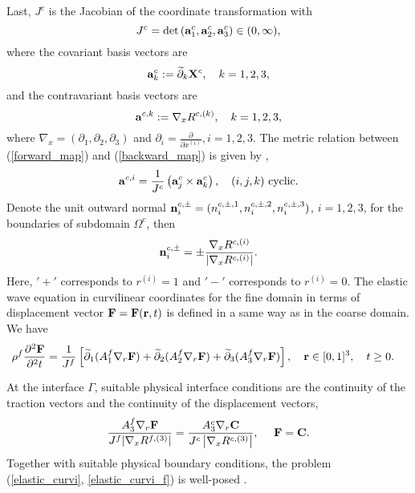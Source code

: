 Last, $J^c$ is the Jacobian of the coordinate transformation with
\[J^c = \mbox{det} \left({\bf a}^c_1,{\bf a}^c_2,{\bf a}^c_3\right)\in (0,\infty),\] 
where the covariant basis vectors are
\begin{equation}\label{forward_map}
{\bf a}_k^c := \wt{\partial}_k{\bf X}^c, \ \ \ k = 1,2,3,
\end{equation}
and the contravariant basis vectors are
\begin{equation}\label{backward_map}
{\bf a}^{c,k} := \nabla_x R^{c,(k)},\ \ \ k = 1,2,3,
\end{equation}
 where $\nabla_x = (\partial_1, \partial_2, \partial_3)$ and $\partial_i = \frac{\partial}{\partial x^{(i)}}, i = 1,2,3$. The metric relation between (\ref{forward_map}) and (\ref{backward_map}) is given by \cite{thompson1985numerical},
\begin{equation*}
{\bf a}^{c,i} = \frac{1}{J^c}\left({\bf a}_j^c\times{\bf a}_k^c\right), \ \ \ (i,j,k) \ \mbox{cyclic}.
\end{equation*}
Denote the unit outward normal ${\bf n}_i^{c,\pm} = (n_i^{c,\pm,1},n_i^{c,\pm,2},n_i^{c,\pm,3})$, $i = 1,2,3$, for the boundaries of subdomain $\Omega^c$, then
\begin{align}\label{outward_normal}
{\bf n}_i^{c,\pm}  = \pm \frac{\nabla_x R^{c,(i)}}{|\nabla_x R^{c,(i)}|}.
\end{align}
Here, $'+'$ corresponds to $r^{(i)} = 1$ and $'-'$ corresponds to $r^{(i)} = 0$. The elastic wave equation in curvilinear coordinates for the fine domain in terms of displacement vector ${\bf F} = {\bf F}({\bf r}, t)$ is defined in a same way as in the  coarse domain. We have 
\begin{align}\label{elastic_curvi_f}
	\rho^f\frac{\partial^2{\bf F}}{\partial^2 t} &= \frac{1}{J^f}\left[\wt{\partial}_1(A_1^f\nabla_r{\bf F}) + \wt{\partial}_2(A_2^f\nabla_r{\bf F}) + \wt{\partial}_3(A_3^f\nabla_r{\bf F}) \right], \ \ \  {\bf r}\in [0,1]^3,\ \ \  t\geq0.
\end{align}

At the interface $\Gamma$, suitable physical interface conditions are the continuity of the traction vectors and the continuity of the displacement vectors,
\begin{equation}\label{interface_cond}
\frac{A_3^f\nabla_r{\bf F}}{J^f|\nabla_x R^{f,(3)}|}  = \frac{A_3^c\nabla_r{\bf C}}{J^c\left|\nabla_x R^{c,(3)}\right|}, \ \ \ \ {\bf F} = {\bf C}.
\end{equation}
Together with suitable physical boundary conditions, the problem (\ref{elastic_curvi}, \ref{elastic_curvi_f}) is well-posed \cite{duru2014stable, petersson2015wave}.



